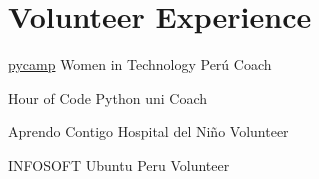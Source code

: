 \section{Volunteer Experience}

{\href{http://www.witperu.org/proyectos/teens-pycamp/}{pycamp}}
{Women in Technology Perú}
{Coach}{}
{}  

{Hour of Code}
{Python uni}
{Coach}{}
{}  

{Aprendo Contigo}
{Hospital del Niño}
{Volunteer}{}
{}  

{INFOSOFT}
{Ubuntu Peru}
{Volunteer}{}
{}  
